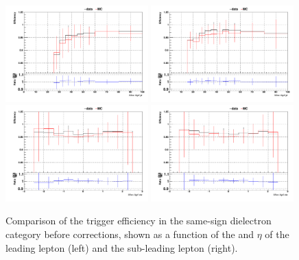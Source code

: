 \begin{figure}[htp]
\centering
\includegraphics[width=0.49\textwidth]{ch6_figs/1D_eff_lep1_pt_ee_ARCv2_change_3l_pt_ranges.pdf}
\includegraphics[width=0.49\textwidth]{ch6_figs/1D_eff_lep2_pt_ee_ARCv2_change_3l_pt_ranges.pdf} \\
\includegraphics[width=0.49\textwidth]{ch6_figs/1D_eff_lep1_eta_ee_ARCv2_change_3l_pt_ranges.pdf}
\includegraphics[width=0.49\textwidth]{ch6_figs/1D_eff_lep2_eta_ee_ARCv2_change_3l_pt_ranges.pdf}
\caption[Trigger efficiency in the 2lss $ee$ category]{Comparison of the trigger efficiency in the same-sign dielectron category before 
corrections, shown as a function of the \pt and $\eta$ of the leading lepton (left) 
and the sub-leading lepton (right).}
\label{fig:trigeffsee}
\end{figure}




